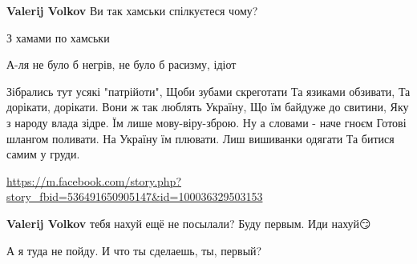 \begin{itemize}
\begin{itemize}
\textbf{Valerij Volkov} Ви так хамськи спілкуєтеся чому?

 
З хамами по хамськи

 
А-ля не було б негрів, не було б расизму, ідіот

\end{itemize}

 
\obeycr
Зібрались тут усякі "патрійоти",
Щоби зубами скреготати
Та язиками обзивати,
Та дорікати, дорікати.
Вони ж так люблять Україну,
Що їм байдуже до свитини,
Яку з народу влада зідре.
Їм лише мову-віру-зброю.
Ну а словами - наче гноєм
Готові шлангом поливати.
На Україну їм плювати.
Лиш вишиванки одягати
Та битися самим у груди.
\restorecr

\url{https://m.facebook.com/story.php?story_fbid=536491650905147&id=100036329503153}

\begin{itemize}
 
\textbf{Valerij Volkov} тебя нахуй ещё не посылали? Буду первым. Иди нахуй😏

 
А я туда не пойду.
И что ты сделаешь, ты, первый?


\end{itemize}
\end{itemize}
